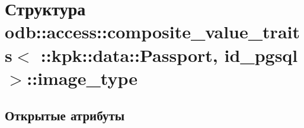 \hypertarget{structodb_1_1access_1_1composite__value__traits_3_01_1_1kpk_1_1data_1_1_passport_00_01id__pgsql_01_4_1_1image__type}{}\section{Структура odb\+:\+:access\+:\+:composite\+\_\+value\+\_\+traits$<$ \+:\+:kpk\+:\+:data\+:\+:Passport, id\+\_\+pgsql $>$\+:\+:image\+\_\+type}
\label{structodb_1_1access_1_1composite__value__traits_3_01_1_1kpk_1_1data_1_1_passport_00_01id__pgsql_01_4_1_1image__type}
\subsection*{Открытые атрибуты}
